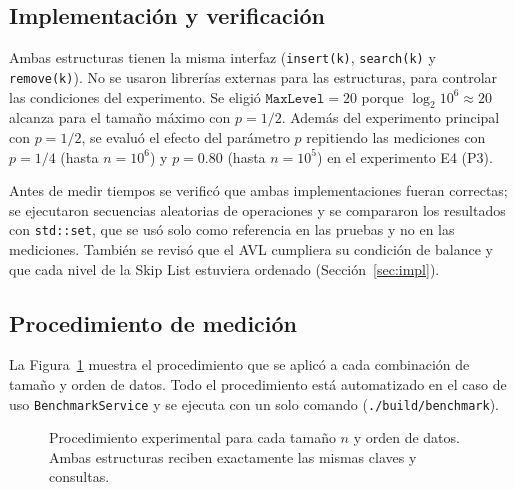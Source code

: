 \documentclass[11pt,a4paper]{article}
\begin{document}
\subsection{Implementación y verificación}

Ambas estructuras tienen la misma interfaz (\texttt{insert(k)},
\texttt{search(k)} y \texttt{remove(k)}). No se usaron librerías externas para
las estructuras, para controlar las condiciones del experimento. Se eligió
$\texttt{MaxLevel} = 20$ porque $\log_2 10^6 \approx 20$ alcanza para el
tamaño máximo con $p = 1/2$. Además del experimento principal con $p = 1/2$, se
evaluó el efecto del parámetro $p$ repitiendo las mediciones con $p = 1/4$
(hasta $n = 10^6$) y $p = 0.80$ (hasta $n = 10^5$) en el experimento E4 (P3).

Antes de medir tiempos se verificó que ambas implementaciones fueran
correctas; se ejecutaron secuencias aleatorias de operaciones y se compararon
los resultados con \texttt{std::set}, que se usó solo como referencia en las
pruebas y no en las mediciones. También se revisó que el AVL cumpliera su
condición de balance y que cada nivel de la Skip List estuviera ordenado
(Sección~\ref{sec:impl}).

\subsection{Procedimiento de medición}

La Figura~\ref{fig:pipeline} muestra el procedimiento que se aplicó a cada
combinación de tamaño y orden de datos. Todo el procedimiento está automatizado
en el caso de uso \texttt{BenchmarkService} y se ejecuta con un solo comando
(\texttt{./build/benchmark}).

\begin{figure}[!htb]
\centering
{}
\caption{Procedimiento experimental para cada tamaño $n$ y orden de datos.
Ambas estructuras reciben exactamente las mismas claves y consultas.}
\label{fig:pipeline}
\end{figure}
\end{document}
